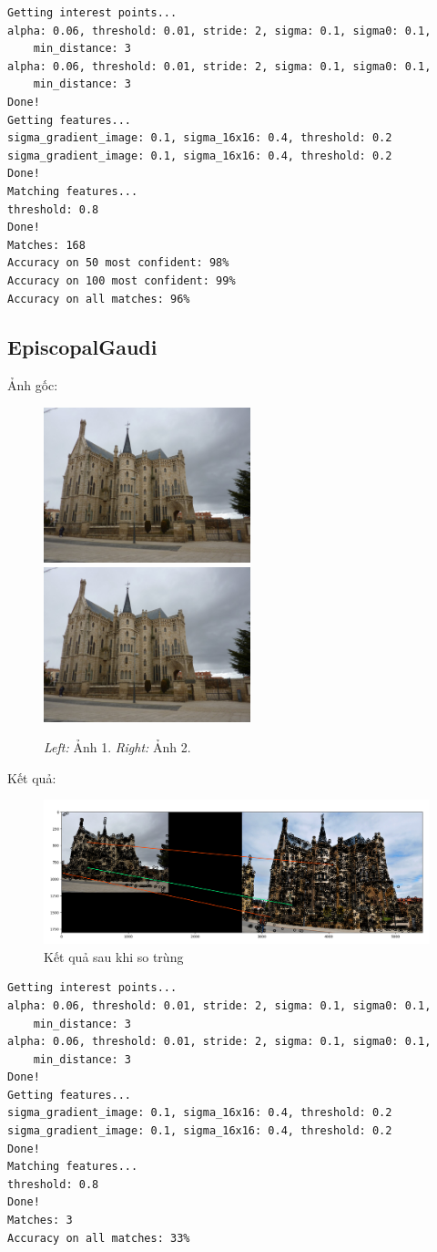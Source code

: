 \documentclass[11pt]{article}
\begin{document}
\begin{verbatim}
Getting interest points...
alpha: 0.06, threshold: 0.01, stride: 2, sigma: 0.1, sigma0: 0.1,
    min_distance: 3
alpha: 0.06, threshold: 0.01, stride: 2, sigma: 0.1, sigma0: 0.1,
    min_distance: 3
Done!
Getting features...
sigma_gradient_image: 0.1, sigma_16x16: 0.4, threshold: 0.2
sigma_gradient_image: 0.1, sigma_16x16: 0.4, threshold: 0.2
Done!
Matching features...
threshold: 0.8
Done!
Matches: 168
Accuracy on 50 most confident: 98%
Accuracy on 100 most confident: 99%
Accuracy on all matches: 96%
\end{verbatim}

\subsection*{EpiscopalGaudi}
Ảnh gốc:
\begin{figure}[H]
    \centering
    \includegraphics[width=6cm]{images/EpiscopalGaudi/EGaudi_1.jpg}
    \includegraphics[width=6cm]{images/EpiscopalGaudi/EGaudi_1.jpg}
    \caption{\emph{Left:} Ảnh 1. \emph{Right:} Ảnh 2.}
\end{figure}
Kết quả:
\begin{figure}[H]
    \centering
    \includegraphics[width=15cm]{images/EpiscopalGaudi/Figure_3.png}
    \caption{Kết quả sau khi so trùng}
\end{figure}
\begin{verbatim}
Getting interest points...
alpha: 0.06, threshold: 0.01, stride: 2, sigma: 0.1, sigma0: 0.1,
    min_distance: 3
alpha: 0.06, threshold: 0.01, stride: 2, sigma: 0.1, sigma0: 0.1,
    min_distance: 3
Done!
Getting features...
sigma_gradient_image: 0.1, sigma_16x16: 0.4, threshold: 0.2
sigma_gradient_image: 0.1, sigma_16x16: 0.4, threshold: 0.2
Done!
Matching features...
threshold: 0.8
Done!
Matches: 3
Accuracy on all matches: 33%
\end{verbatim}
\end{document}

